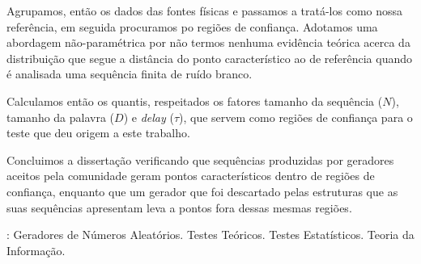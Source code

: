 \documentclass[tcc]{ic}
\begin{document}
\begin{resumo}

Agrupamos, então os dados das fontes físicas e passamos a tratá-los como nossa referência, em seguida procuramos po regiões de confiança. Adotamos uma abordagem não-paramétrica por não termos nenhuma evidência teórica acerca da distribuição que segue a distância do ponto característico ao de referência quando é analisada uma sequência finita de ruído branco.

Calculamos então os quantis, respeitados os fatores tamanho da sequência ($N$), tamanho da palavra ($D$) e \textit{delay} ($\tau$), que servem como regiões de confiança para o teste que deu origem a este trabalho.

Concluimos a dissertação verificando que sequências produzidas por geradores aceitos pela comunidade geram pontos característicos dentro de regiões de confiança, enquanto que um gerador que foi descartado pelas estruturas que as suas sequências apresentam leva a pontos fora dessas mesmas regiões.

\vspace{1em}
: Geradores de Números Aleatórios. Testes Teóricos. Testes Estatísticos. Teoria da Informação.
\end{resumo}
\end{document}
